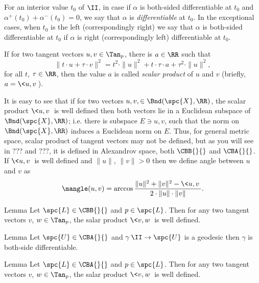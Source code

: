 {For an interior value $t_0$ of $\II$,
in case if $\alpha$ is both-sided differentiable at $t_0$ and $\alpha^+(t_0)+\alpha^-(t_0)=0$, we say that $\alpha$ is \emph{differentiable} at $t_0$.
In the exceptional cases, when $t_0$ is the left (correspondingly right)
we say that $\alpha$ is both-sided differentiable at $t_0$ if $\alpha$ is right (correspondingly left) differentiable at $t_0$.














If for two tangent vectors $u,v\in\Tan_p$,
there is $a\in\RR$ such that
$$\|t\cdot u+\tau\cdot v\|^2=t^2\cdot\|u\|^2+t\cdot\tau\cdot a+\tau^2\cdot \|u\|^2,$$
for all $t$, $\tau\in\RR$, 
then the value $a$ is called \emph{scalar product} of $u$ and $v$ (briefly, $a=\<u,v\>$).

It is easy to see that if for two vectors $u,v,\in \Bnd(\spc{X},\RR)$, the scalar product $\<u,v\>$ is well defined then both vectors lie in a Euclidean subspace of $\Bnd(\spc{X},\RR)$;
i.e. there is subspace $E\ni u,v$, such that the norm on $\Bnd(\spc{X},\RR)$ induces a Euclidean norm on $E$.
Thus, for general metric space, scalar product of tangent vectors may not be defined, but as you will see in ??? and ???, it is defined in Alexandrov space, both $\CBB{}{}$ and $\CBA{}{}$.
If $\<u,v\>$ is well defined and $\|u\|$, $\|v\|>0$ then we define angle between $u$ and $v$ as 
$$
\mangle(u,v)
=
\arccos\frac{\|u\|^2+\|v\|^2-\<u,v\>}{2\cdot\|u\|\cdot\|v\|}.
$$ 












\begin{thm}{Lemma}
Let $\spc{L}\in\CBB{}{}$ and $p\in\spc{L}$.
Then for any two tangent vectors $v$, $w\in\Tan_p$, the salar product $\<v,w\>$ is well defined.
\end{thm}

\begin{thm}{Lemma}
Let $\spc{U}\in\CBA{}{}$ 
and $\gamma\:\II\to\spc{U}$ is a geodesic then $\gamma$ is both-side differentiable.
\end{thm}


\begin{thm}{Lemma}
Let $\spc{L}\in\CBA{}{}$ and $p\in\spc{L}$.
Then for any two tangent vectors $v$, $w\in\Tan_p$, the salar product $\<v,w\>$ is well defined.
\end{thm}














}
